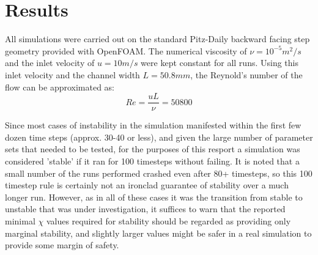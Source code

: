 \chapter{Results}


All simulations were carried out on the standard Pitz-Daily backward facing step geometry provided with OpenFOAM. The numerical viscosity of $\nu=10^{-5} m^2/s$ and the inlet velocity of $u=10 m/s$ were kept constant for all runs. Using this inlet velocity and the channel width $L=50.8 mm$, the Reynold's number of the flow can be approximated as: $$ Re=\frac{uL}{\nu}=50800$$

Since most cases of instability in the simulation manifested within the first few dozen time steps (approx. 30-40 or less), and given the large number of parameter sets that needed to be tested, for the purposes of this resport a simulation was considered 'stable' if it ran for 100 timesteps without failing. It is noted that a small number of the runs performed crashed even after 80+ timesteps, so this 100 timestep rule is certainly not an ironclad guarantee of stability over a much longer run. However, as in all of these cases it was the transition from stable to unstable that was under investigation, it suffices to warn that the reported minimal $\chi$ values required for stability should be regarded as providing only marginal stability, and slightly larger values might be safer in a real simulation to provide some margin of safety.